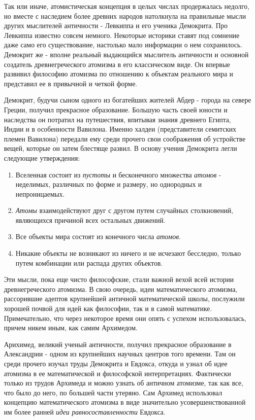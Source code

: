 Так или иначе, атомистическая концепция в целых числах продержалась недолго, но вместе с наследием более древних народов натолкнула на правильные мысли других мыслителей античности - Левкиппа и его ученика Демокрита.
Про Левкиппа известно совсем немного.
Некоторые историки ставят под сомнение даже само его существование, настолько мало информации о нем сохранилось.
Демокрит же - вполне реальный выдающийся мыслитель античности и основной создатель древнегреческого атомизма в его классическом виде. 
Он впервые развивил философию атомизма по отношению к объектам реального мира и представил ее в привычной и четкой форме.

Демокрит, будучи сыном одного из богатейших жителей Абдер - города на севере Греции, получил прекрасное образование.
Большую часть своей юности и наследства он потратил на путешествия, впитывая знания древнего Египта, Индии и в особенности Вавилона.
Именно халдеи (представители семитских племен Вавилона) передали ему среди прочего свои соображения об устройстве вещей, которые он затем блестяще развил.
В основу учения Демокрита легли следующие утверждения:
\begin{enumerate}
    \item Вселенная состоит из \textit{пустоты} и бесконечного множества \textit{атомов} - неделимых, различных по форме и размеру, но однородных и непроницаемых.
    \item \textit{Атомы} взаимодействуют друг с другом путем случайных столкновений, являющихся причиной всех остальных движений. 
    \item Все объекты мира состоят из конечного числа \textit{атомов}.
    \item Никакие объекты не возникают из ничего и не исчезают бесследно, только путем комбинации или распада других объектов.
\end{enumerate} 

Эти мысли, пока еще чисто философские, стали важной вехой всей истории древнегреческого атомизма.
В свою очередь, идеи математического атомизма, рассорившие адептов крупнейшей античной математической школы, послужили хорошей почвой для идей как философии, так и в самой математике. 
Примечательно, что через некоторое время они опять с успехом использовалась, причем никем иным, как самим Архимедом.

Арихимед, великий ученый античности, получил прекрасное образование в Александрии - одном из крупнейших научных центров того времени. 
Там он среди прочего изучал труды Демокрита и Евдокса, откуда и узнал об идее атомизма в ее математической и философской интерпретациях.
Фактически только из трудов Архимеда и можно узнать об античном атомизме, так как все, что было до него, по большей части утеряно.
Сам Архимед использовал концепцию математического атомизма в виде значительно усовершенствованной им более ранней \textit{идеи равносоставленности} Евдокса.

